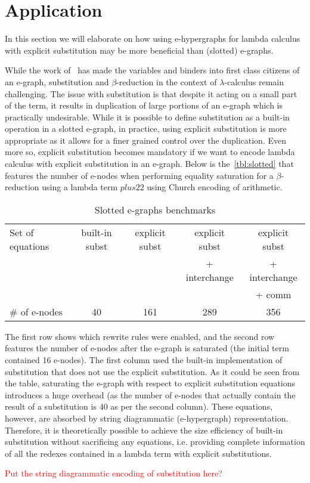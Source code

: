 \section{Application}

In this section we will elaborate on how using e-hypergraphs for lambda calculus with explicit substitution may be more beneficial than (slotted) e-graphs.

While the work of~\cite{slotted-egraphs} has made the variables and binders into first class citizens of an e-graph, substitution and $\beta$-reduction in the context of $\lambda$-calculus remain challenging.
The issue with substitution is that despite it acting on a small part of the term, it results in duplication of large portions of an e-graph which is practically undesirable.
While it is possible to define substitution as a built-in operation in a slotted e-graph, in practice, using explicit substitution is more appropriate as it allows for a finer grained control over the duplication.
Even more so, explicit substitution becomes mandatory if we want to encode lambda calculus with explicit substitution in an e-graph.
Below is the~\autoref{tbl:slotted} that features the number of e-nodes when performing equality saturation for a $\beta$-reduction using a lambda term $plus 2 2$ using Church encoding of arithmetic.

\begin{table}
	\begin{tabular}{lcccc}
		Set of equations & built-in subst & explicit subst & explicit subst & explicit subst \\
		                 &                &                & + interchange  & + interchange  \\
		                 &                &                &                & + comm         \\
		\# of e-nodes    & 40             & 161            & 289            & 356
	\end{tabular}
	\caption{Slotted e-graphs benchmarks}
	\label{tbl:slotted}
\end{table}

The first row shows which rewrite rules were enabled, and the second row features the number of e-nodes after the e-graph is saturated (the initial term contained 16 e-nodes).
The first column used the built-in implementation of substitution that does not use the explicit substitution.
As it could be seen from the table, saturating the e-graph with respect to explicit substitution equations introduces a huge overhead (as the number of e-nodes that actually contain the result of a substitution is 40 as per the second column).
These equations, however, are absorbed by string diagrammatic (e-hypergraph) representation. Therefore, it is theoretically possible to achieve the size efficiency of built-in substitution without sacrificing any equations, i.e. providing complete information of all the redexes contained in a lambda term with explicit substitutions.

\textcolor{red}{Put the string diagrammatic encoding of substitution here?}
